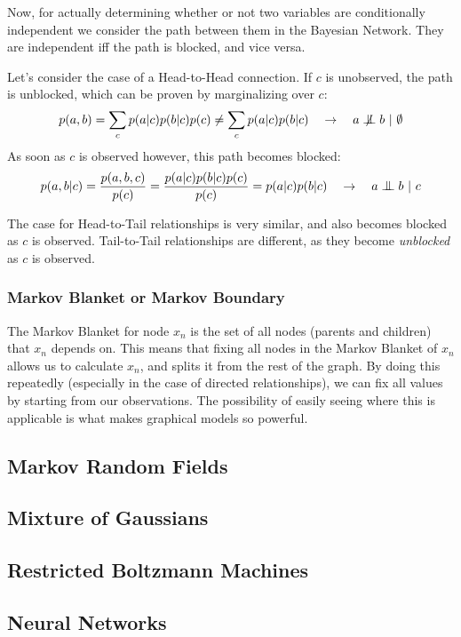 \documentclass{article}
\newcommand{\bigCI}{\mathrel{\text{\scalebox{1.07}{$\perp\mkern-10mu\perp$}}}}
\newcommand{\nbigCI}{\centernot{\bigCI}}
\begin{document}
Now, for actually determining whether or not two variables are conditionally independent we consider the path between them in the Bayesian Network.
They are independent iff the path is blocked, and vice versa.

Let's consider the case of a Head-to-Head connection.
If $c$ is unobserved, the path is unblocked, which can be proven by marginalizing over $c$:
\begin{equation}
	p(a,b) = \sum_c p(a|c) p(b|c) p(c) \neq \sum_c p(a|c) p(b|c) \quad \rightarrow \quad a \nbigCI b\ |\ \emptyset
\end{equation}
As soon as $c$ is observed however, this path becomes blocked:
\begin{equation}
	p(a,b|c) = \frac{p(a,b,c)}{p(c)} = \frac{p(a|c) p(b|c) p(c)}{p(c)} = p(a|c) p(b|c) \quad \rightarrow \quad a \bigCI b\ |\ c
\end{equation}

The case for Head-to-Tail relationships is very similar, and also becomes blocked as $c$ is observed.
Tail-to-Tail relationships are different, as they become \emph{unblocked} as $c$ is observed.

\subsubsection{Markov Blanket or Markov Boundary}
The Markov Blanket for node $x_n$ is the set of all nodes (parents and children) that $x_n$ depends on.
This means that fixing all nodes in the Markov Blanket of $x_n$ allows us to calculate $x_n$, and splits it from the rest of the graph.
By doing this repeatedly (especially in the case of directed relationships), we can fix all values by starting from our observations.
The possibility of easily seeing where this is applicable is what makes graphical models so powerful.

\subsection{Markov Random Fields}

\subsection{Mixture of Gaussians}

\subsection{Restricted Boltzmann Machines}

\subsection{Neural Networks}
\end{document}
